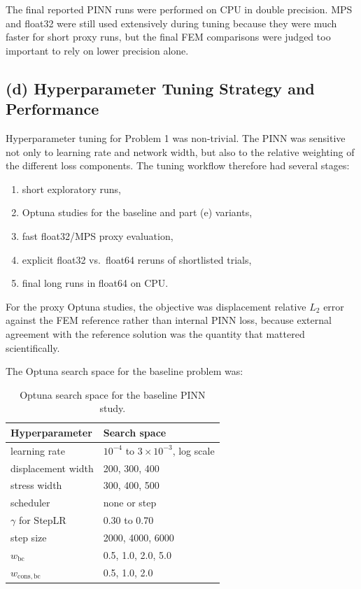 \documentclass[11pt]{article}
\begin{document}
The final reported PINN runs were performed on CPU in double precision. MPS and float32 were still used extensively during tuning because they were much faster for short proxy runs, but the final FEM comparisons were judged too important to rely on lower precision alone.

\subsection*{(d) Hyperparameter Tuning Strategy and Performance}

Hyperparameter tuning for Problem 1 was non-trivial. The PINN was sensitive not only to learning rate and network width, but also to the relative weighting of the different loss components. The tuning workflow therefore had several stages:
\begin{enumerate}[itemsep=0.25em]
    \item short exploratory runs,
    \item Optuna studies for the baseline and part (e) variants,
    \item fast float32/MPS proxy evaluation,
    \item explicit float32 vs.\ float64 reruns of shortlisted trials,
    \item final long runs in float64 on CPU.
\end{enumerate}

For the proxy Optuna studies, the objective was displacement relative \(L_2\) error against the FEM reference rather than internal PINN loss, because external agreement with the reference solution was the quantity that mattered scientifically.

The Optuna search space for the baseline problem was:

\begin{table}[H]
\centering
\begin{tabular}{ll}
\toprule
Hyperparameter & Search space \\
\midrule
learning rate & \(10^{-4}\) to \(3\times10^{-3}\), log scale \\
displacement width & 200, 300, 400 \\
stress width & 300, 400, 500 \\
scheduler & none or step \\
\(\gamma\) for StepLR & 0.30 to 0.70 \\
step size & 2000, 4000, 6000 \\
\(w_{\mathrm{bc}}\) & 0.5, 1.0, 2.0, 5.0 \\
\(w_{\mathrm{cons,bc}}\) & 0.5, 1.0, 2.0 \\
\bottomrule
\end{tabular}
\caption{Optuna search space for the baseline PINN study.}
\end{table}
\end{document}
